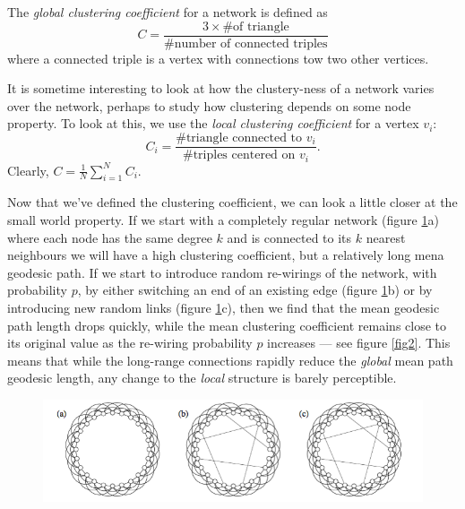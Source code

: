 \documentclass{article}
\begin{document}
The \emph{global clustering coefficient} for a network is defined as
$$
	C=\frac{3\times\text{\# of triangle}}{\text{\# number of connected triples}}
$$
where a connected triple is a vertex with connections tow two other vertices.

It is sometime interesting to look at how the clustery-ness of a network varies over the network, perhaps to study how clustering depends on some node property. To look at this, we use the \emph{local clustering coefficient} for a vertex $v_i$:
$$
	C_i = \frac{\text{\# triangle connected to }v_i}{\text{\# triples centered on }v_i}.
$$
Clearly, $C = \frac{1}{N}\sum_{i=1}^NC_i$.

Now that we've defined the clustering coefficient, we can look a little closer at the small world property.
If we start with a completely regular network (figure \ref{fig1}a) where each node has the same degree $k$ and is connected to its $k$ nearest neighbours we will have a high clustering coefficient, but a relatively long mena geodesic path. If we start to introduce random re-wirings of the network, with probability $p$, by either switching an end of an existing edge (figure \ref{fig1}b) or by introducing new random links (figure \ref{fig1}c), then we find that the mean geodesic path length drops quickly, while the mean clustering coefficient remains close to its original value as the re-wiring probability $p$ increases --- see figure \ref{fig2}. This means that while the long-range connections rapidly reduce the \emph{global} mean path geodesic length, any change to the \emph{local} structure is barely perceptible.

\begin{figure}
	\begin{center}
		\includegraphics[width = 12cm]{regularNW.png}
	\end{center}
	\caption{}
	\label{fig1}
\end{figure}
\end{document}
